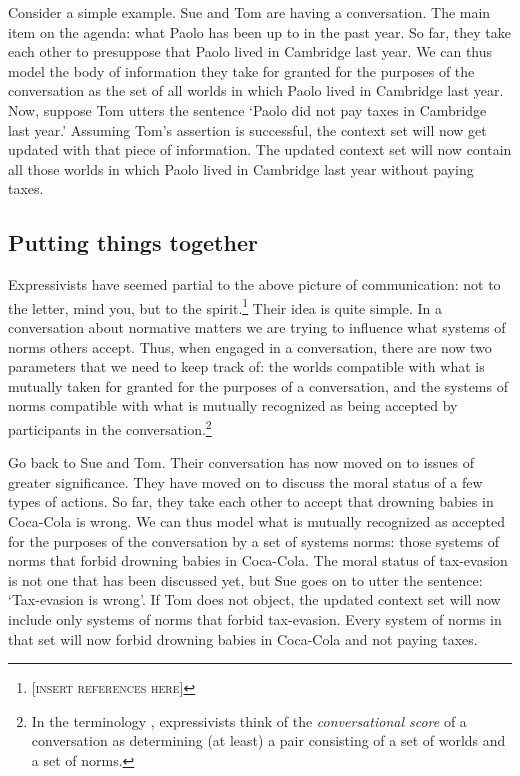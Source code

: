 \documentclass[11pt,article,oneside]{memoir}
\begin{document}
Consider a simple example. Sue and Tom are having a conversation. The main item on the agenda: what Paolo has been up to in the past year. So far, they take each other to presuppose that Paolo lived in Cambridge last year. We can thus model the body of information they take for granted for the purposes of the conversation as the set of all worlds in which Paolo lived in Cambridge last year. Now, suppose Tom utters the sentence `Paolo did not pay taxes in Cambridge last year.' Assuming Tom's assertion is successful, the context set will now get updated with that piece of information. The updated context set will now contain all those worlds in which Paolo lived in Cambridge last year without paying taxes. 


\subsection{Putting things together}

Expressivists have seemed partial to the above picture of communication: not to the letter, mind you, but to the spirit.\footnote{[\textsc{insert references here}]} Their idea is quite simple. In a conversation about normative matters we are trying to influence what systems of norms others accept. Thus, when engaged in a conversation, there are now two parameters that we need to keep track of: the worlds compatible with what is mutually taken for granted for the purposes of a conversation, and the systems of norms compatible with what is mutually recognized as being accepted by participants in the conversation.\footnote{In the terminology \citealt{lewis1979}, expressivists think of the \emph{conversational score} of a conversation as determining (at least) a pair consisting of a set of worlds and a set of norms.} 

Go back to Sue and Tom. Their conversation has now moved on to issues of greater significance. They have moved on to discuss the moral status of a few types of actions. So far, they take each other to accept that drowning babies in Coca-Cola is wrong. We can thus model what is mutually recognized as accepted for the purposes of the conversation by a set of systems norms: those systems of norms that forbid drowning babies in Coca-Cola. The moral status of tax-evasion is not one that has been discussed yet, but Sue goes on to utter the sentence: `Tax-evasion is wrong'. If Tom does not object, the updated context set will now include only systems of norms that forbid tax-evasion. Every system of norms in that set will now forbid drowning babies in Coca-Cola and not paying taxes. 
\end{document}
